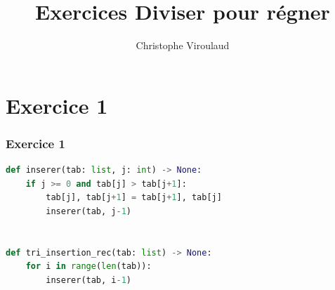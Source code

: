 \documentclass[svgnames,11pt]{beamer}
\author[]{Christophe Viroulaud}
\title{Exercices Diviser pour régner}
\date{\framebox{\textbf{Algo 02}}}
\institute{Terminale - NSI}
\begin{document}
\begin{frame}
    \titlepage
\end{frame}
\section{Exercice 1}
\begin{frame}[fragile]
    \frametitle{Exercice 1}

    \begin{center}
        \begin{lstlisting}[language=Python , basicstyle=\ttfamily\small, xleftmargin=2em, xrightmargin=2em]
def inserer(tab: list, j: int) -> None:
    if j >= 0 and tab[j] > tab[j+1]:
        tab[j], tab[j+1] = tab[j+1], tab[j]
        inserer(tab, j-1)


def tri_insertion_rec(tab: list) -> None:
    for i in range(len(tab)):
        inserer(tab, i-1)
\end{lstlisting}
    \end{center}

\end{frame}
\end{document}
